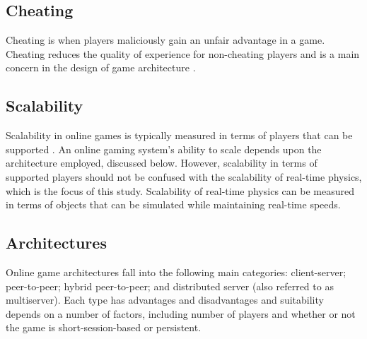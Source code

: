 
\subsection{Cheating}
Cheating is when players maliciously gain an unfair advantage in a game. Cheating reduces the quality of experience for non-cheating players and is a main concern in the design of game architecture \cite{P2PForMMOs}. 

\subsection{Scalability}
Scalability in online games is typically measured in terms of players that can be supported \cite{turchini2015scalability}. An online gaming system's ability to scale depends upon the architecture employed, discussed below. However, scalability in terms of supported players should not be confused with the scalability of real-time physics, which is the focus of this study. Scalability of real-time physics can be measured in terms of objects that can be simulated while maintaining real-time speeds.



\subsection{Architectures}
Online game architectures fall into the following main categories: client-server; peer-to-peer; hybrid peer-to-peer; and distributed server (also referred to as multiserver). Each type has advantages and disadvantages and suitability depends on a number of factors, including number of players and whether or not the game is short-session-based or persistent.

